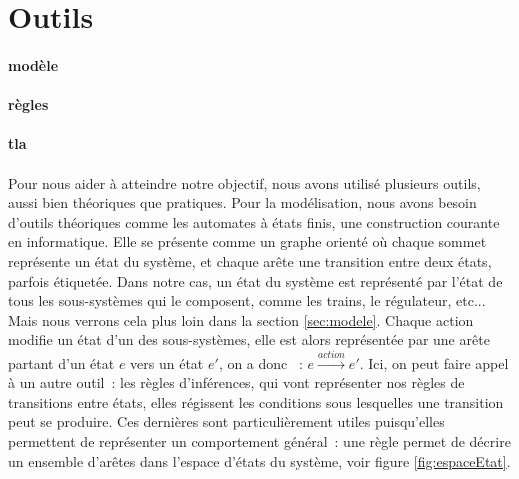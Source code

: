 \documentclass[oneside, a4paper, 11pt]{book}
\begin{document}
\section{Outils}

\paragraph{modèle}
\paragraph{règles}
\paragraph{tla}



\paragraph{}
Pour nous aider à atteindre notre objectif, nous avons utilisé plusieurs outils, aussi bien théoriques que pratiques.
Pour la modélisation, nous avons besoin d'outils théoriques comme les automates à états finis, une construction courante en informatique. Elle se présente comme un graphe orienté
où chaque sommet représente un état du système, et chaque arête une transition entre deux états, parfois étiquetée.
Dans notre cas, un état du système est représenté par l'état de tous les sous-systèmes qui le composent, comme les trains, le régulateur, etc... 
Mais nous verrons cela plus loin dans la section \ref{sec:modele}.
Chaque action modifie un état d'un des sous-systèmes, elle est alors représentée par une arête partant d'un état $e$ vers un état $e'$, on a donc ~: $e \xrightarrow{action} e'$.
Ici, on peut faire appel à un autre outil~: les règles d'inférences, qui vont représenter nos règles de transitions entre états, elles régissent les conditions sous lesquelles une transition peut se produire.
Ces dernières sont particulièrement utiles puisqu'elles permettent de représenter un comportement général~: une règle permet de décrire un ensemble d'arêtes dans l'espace d'états du système, voir figure \ref{fig:espaceEtat}.
\end{document}
